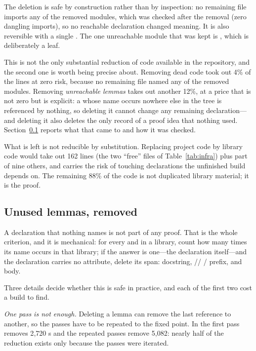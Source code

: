 The deletion is safe by construction rather than by inspection: no remaining file imports any
of the removed modules, which was checked after the removal (zero dangling imports), so no
reachable declaration changed meaning. It is also reversible with a single .
The one unreachable module that was kept is , which is
deliberately a leaf.

This is not the only substantial reduction of code available in the repository, and the
second one is worth being precise about. Removing dead code took out 4\% of the lines at
zero risk, because no remaining file named any of the removed modules. Removing
\emph{unreachable lemmas} takes out another 12\%, at a price that is not zero but is
explicit: a  whose name occurs nowhere else in the tree is referenced by
nothing, so deleting it cannot change any remaining declaration---and deleting it also
deletes the only record of a proof idea that nothing used. Section~\ref{sec:unused} reports
what that came to and how it was checked.

What is left is not reducible by substitution. Replacing project code by library code would
take out 162 lines (the two ``free'' files of Table~\ref{tab:infra}) plus part of nine
others, and carries the risk of touching declarations the unfinished build depends on. The
remaining 88\% of the code is not duplicated library material; it is the proof.

\subsection{Unused lemmas, removed}
\label{sec:unused}

A declaration that nothing names is not part of any proof. That is the whole criterion, and
it is mechanical: for every  and  in a library, count how many
times its name occurs in that library; if the answer is one---the declaration itself---and
the declaration carries no attribute, delete its span: docstring, //
/ prefix, and body.

Three details decide whether this is safe in practice, and each of the first two cost a
build to find.

\emph{One pass is not enough.} Deleting a lemma can remove the last reference to another, so
the passes have to be repeated to the fixed point. In  the first pass
removes 2{,}720 s and the repeated passes remove 5{,}082: nearly half of the
reduction exists only because the passes were iterated.

